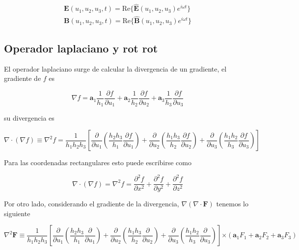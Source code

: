 \begin{eqnarray*}
\mathbf{E} (u_1,u_2,u_3,t) = \text{Re} \{ \mathbf{\hat{E}}(u_1,u_2,u_3) e^{i \omega t} \} \\
\mathbf{B} (u_1,u_2,u_3,t) = \text{Re} \{ \mathbf{\hat{B}}(u_1,u_2,u_3) e^{i \omega t} \}
\end{eqnarray*}

\subsection{Operador laplaciano y rot rot}

El operador laplaciano surge de calcular la divergencia de un gradiente, el gradiente de $f$ es 

\begin{equation*}
\nabla f = \mathbf{a}_1 \frac{1}{h_1} \frac{\partial f}{\partial u_1} + \mathbf{a}_2 \frac{1}{h_2} \frac{\partial f}{\partial u_2} + \mathbf{a}_3 \frac{1}{h_3} \frac{\partial f}{\partial u_3}
\end{equation*}

su divergencia es

\begin{equation*}
\nabla \cdot (\nabla f) \equiv \nabla^2 f= \frac{1}{h_1 h_2 h_3} \left[ \frac{\partial}{\partial u_1} \left( \frac{h_2 h_3 }{h_1 } \frac{\partial f}{\partial u_1} \right) + \frac{\partial}{\partial u_2} \left( \frac{h_1 h_3 }{h_2 } \frac{\partial f}{\partial u_2} \right) + \frac{\partial}{\partial u_3} \left( \frac{h_1 h_2 }{h_3 } \frac{\partial f}{\partial u_3} \right) \right] 
\end{equation*}

Para las coordenadas rectangulares esto puede escribirse como

\begin{equation*}
\nabla \cdot (\nabla f) = \nabla^2 f = \frac{\partial^2 f }{\partial x^2} + \frac{\partial^2 f }{\partial y^2} + \frac{\partial^2 f}{\partial z^2}
\end{equation*}

Por otro lado, considerando el gradiente de la divergencia, $\nabla (\nabla \cdot \mathbf{F})$ tenemos lo siguiente

\begin{equation*}
\nabla^2 \mathbf{F} \equiv \frac{1}{h_1 h_2 h_3} \left[ \frac{\partial}{\partial u_1} \left( \frac{h_2 h_3 }{h_1 } \frac{\partial }{\partial u_1} \right) + \frac{\partial}{\partial u_2} \left( \frac{h_1 h_3 }{h_2 } \frac{\partial }{\partial u_2} \right) + \frac{\partial}{\partial u_3} \left( \frac{h_1 h_2 }{h_3 } \frac{\partial }{\partial u_3} \right) \right] \mathbf{\times} (\mathbf{a}_1 F_1 + \mathbf{a}_2 F_2 + \mathbf{a}_3 F_3) 
\end{equation*}

